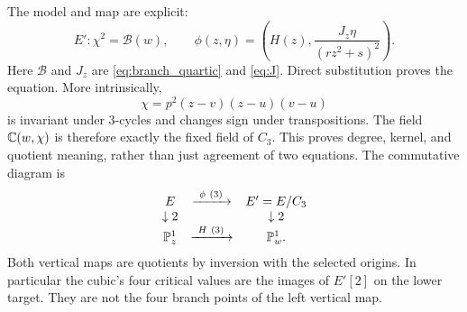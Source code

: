 The model and map are explicit:
\begin{equation}\label{eq:isogeny}
 \boxed{E':\chi^2=\mathcal B(w),\qquad
 \phi(z,\eta)=\left(H(z),\frac{J_z\eta}{(rz^2+s)^2}\right).}
\end{equation}
Here \(\mathcal B\) and \(J_z\) are \eqref{eq:branch_quartic} and \eqref{eq:J}. Direct substitution proves the equation. More intrinsically,
\begin{equation}\label{eq:vandermonde}
 \chi=p^2(z-v)(z-u)(v-u)
\end{equation}
is invariant under 3-cycles and changes sign under transpositions. The field \(\mathbb C(w,\chi)\) is therefore exactly the fixed field of \(C_3\). This proves degree, kernel, and quotient meaning, rather than just agreement of two equations. The commutative diagram is
\begin{equation}\label{eq:isogeny_diagram}
 \begin{array}{ccc}
 E&\xrightarrow{\ \phi\ (3)\ }&E'=E/C_3\\
 \downarrow 2&&\downarrow 2\\
 \mathbb P^1_z&\xrightarrow{\ H\ (3)\ }&\mathbb P^1_w.
 \end{array}
\end{equation}
Both vertical maps are quotients by inversion with the selected origins. In particular the cubic's four critical values are the images of \(E'[2]\) on the lower target. They are not the four branch points of the left vertical map.

